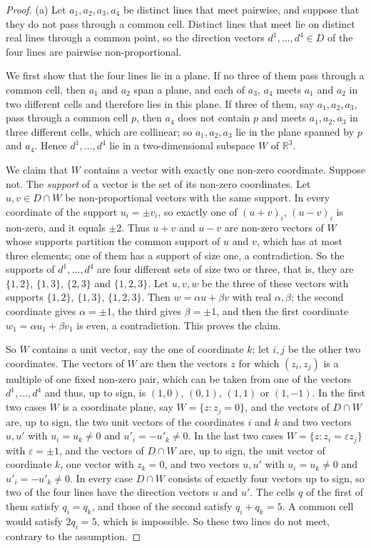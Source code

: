 \begin{proof}
(a) Let $a_1,a_2,a_3,a_4$ be distinct lines that meet pairwise, and suppose that they do not pass through a common
cell. Distinct lines that meet lie on distinct real lines through a common point, so the direction vectors
$d^1,\dots,d^4\in D$ of the four lines are pairwise non-proportional.

We first show that the four lines lie in a plane. If no three of them pass through a common cell, then $a_1$
and $a_2$ span a plane, and each of $a_3$, $a_4$ meets $a_1$ and $a_2$ in two different cells and therefore
lies in this plane. If three of them, say $a_1,a_2,a_3$, pass through a common cell $p$, then $a_4$ does not
contain $p$ and meets $a_1,a_2,a_3$ in three different cells, which are collinear; so $a_1,a_2,a_3$ lie in the
plane spanned by $p$ and $a_4$. Hence $d^1,\dots,d^4$ lie in a two-dimensional subspace $W$ of $\mathbb{R}^3$.

We claim that $W$ contains a vector with exactly one non-zero coordinate. Suppose not. The \emph{support}
of a vector is the set of its non-zero coordinates. Let $u,v\in D\cap W$ be non-proportional vectors with
the same support. In every coordinate of the support $u_i=\pm v_i$, so exactly one of $(u+v)_i$, $(u-v)_i$
is non-zero, and it equals $\pm2$. Thus $u+v$ and $u-v$ are non-zero vectors of $W$ whose supports partition
the common support of $u$ and $v$, which has at most three elements; one of them has a support of size one, a
contradiction. So the supports of $d^1,\dots,d^4$ are four different sets of size two or three, that is, they
are $\{1,2\}$, $\{1,3\}$, $\{2,3\}$ and $\{1,2,3\}$. Let $u,v,w$ be the three of these vectors with supports
$\{1,2\}$, $\{1,3\}$, $\{1,2,3\}$. Then $w=\alpha u+\beta v$ with real $\alpha,\beta$; the second coordinate
gives $\alpha=\pm1$, the third gives $\beta=\pm1$, and then the first coordinate
$w_1=\alpha u_1+\beta v_1$ is even, a contradiction. This proves the claim.

So $W$ contains a unit vector, say the one of coordinate $k$; let $i,j$ be the other two coordinates. The
vectors of $W$ are then the vectors $z$ for which $(z_i,z_j)$ is a multiple of one fixed non-zero pair,
which can be taken from one of the vectors $d^1,\dots,d^4$ and thus, up to sign, is $(1,0)$, $(0,1)$,
$(1,1)$ or $(1,-1)$. In the first two cases $W$ is a coordinate plane, say $W=\{z: z_j=0\}$, and the vectors
of $D\cap W$ are, up to sign, the two unit vectors of the coordinates $i$ and $k$ and two vectors $u,u'$
with $u_i=u_k\ne0$ and $u'_i=-u'_k\ne0$. In the last two cases $W=\{z: z_i=\varepsilon z_j\}$ with
$\varepsilon=\pm1$, and the vectors of $D\cap W$ are, up to sign, the unit vector of coordinate $k$, one
vector with $z_k=0$, and two vectors $u,u'$ with $u_i=u_k\ne0$ and $u'_i=-u'_k\ne0$. In every case $D\cap W$
consists of exactly four vectors up to sign, so two of the four lines have the direction vectors $u$ and
$u'$. The cells $q$ of the first of them satisfy $q_i=q_k$, and those of the second satisfy $q_i+q_k=5$. A
common cell would satisfy $2q_i=5$, which is impossible. So these two lines do not meet, contrary to the
assumption.


\end{proof}
